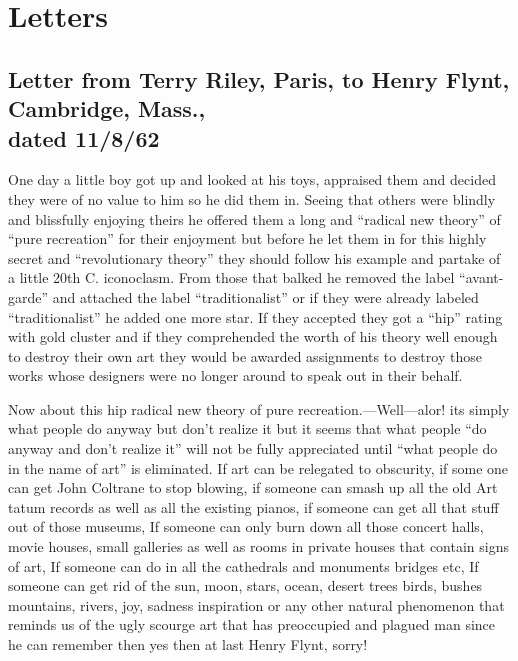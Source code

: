 \chapter{Letters}

\section*{{\normalsize Letter from Terry Riley, Paris, to Henry Flynt, Cambridge, Mass., \\ dated 11/8/62}}

One day a little boy got up and looked at his toys, appraised them and 
decided they were of no value to him so he did them in. Seeing that others 
were blindly and blissfully enjoying theirs he offered them a long and 
\enquote{radical new theory} of \enquote{pure recreation} for their enjoyment but before he 
let them in for this highly secret and \enquote{revolutionary theory} they should 
follow his example and partake of a little 20th C. iconoclasm. From those 
that balked he removed the label \enquote{avant-garde} and attached the label 
\enquote{traditionalist} or if they were already labeled \enquote{traditionalist} he added one 
more star. If they accepted they got a \enquote{hip} rating with gold cluster and if 
they comprehended the worth of his theory well enough to destroy their 
own art they would be awarded assignments to destroy those works whose 
designers were no longer around to speak out in their behalf. 

Now about this hip radical new theory of pure recreation.---Well---alor! its 
simply what people do anyway but don't realize it but it seems that what 
people \enquote{do anyway and don't realize it} will not be fully appreciated until 
\enquote{what people do in the name of art} is eliminated. If art can be relegated to 
obscurity, if some one can get John Coltrane to stop blowing, if someone 
can smash up all the old Art tatum records as well as all the existing pianos, 
if someone can get all that stuff out of those museums, If someone can only 
burn down all those concert halls, movie houses, small galleries as well as 
rooms in private houses that contain signs of art, If someone can do in all the 
cathedrals and monuments bridges etc, If someone can get rid of the sun, 
moon, stars, ocean, desert trees birds, bushes mountains, rivers, joy, sadness 
inspiration or any other natural phenomenon that reminds us of the ugly 
scourge art that has preoccupied and plagued man since he can remember 
then yes then at last Henry Flynt, sorry! 

